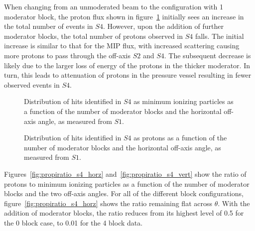 When changing from an unmoderated beam to the configuration with 1 moderator block, the proton flux shown in figure~\ref{fig:thetas4pro} initially sees an increase in the total number of events in $\mathit{S4}$.
However, upon the addition of further moderator blocks, the total number of protons observed in $\mathit{S4}$ falls.
The initial increase is similar to that for the MIP flux, with increased scattering causing more protons to pass through the off-axis $\mathit{S2}$ and $\mathit{S4}$.
The subsequent decrease is likely due to the larger loss of energy of the protons in the thicker moderator.
In turn, this leads to attenuation of protons in the pressure vessel resulting in fewer observed events in $\mathit{S4}$.

\begin{figure}[!ht]
  \begin{minipage}[t]{0.48\textwidth}
    \begin{adjustbox}{max totalsize={\textwidth}{.35\textheight},center}
      
    \end{adjustbox}
    \caption{Distribution of hits identified in $\mathit{S4}$ as minimum ionizing particles as a function of the number of moderator blocks and the horizontal off-axis angle, as measured from $\mathit{S1}$.}
    \label{fig:thetas4mip}
  \end{minipage}
  \hspace{0.3cm}
  \begin{minipage}[t]{0.48\textwidth}
    \begin{adjustbox}{max totalsize={\textwidth}{.35\textheight},center}
      
    \end{adjustbox}
    \caption{Distribution of hits identified in $\mathit{S4}$ as protons as a function of the number of moderator blocks and the horizontal off-axis angle, as measured from $\mathit{S1}$.}
    \label{fig:thetas4pro}
  \end{minipage} 
\end{figure}	

Figures~\ref{fig:propiratio_s4_horz} and~\ref{fig:propiratio_s4_vert} show the ratio of protons to minimum ionizing particles as a function of the number of moderator blocks and the two off-axis angles.
For all of the different block configurations, figure~\ref{fig:propiratio_s4_horz} shows the ratio remaining flat across $\theta$.
With the addition of moderator blocks, the ratio reduces from its highest level of 0.5 for the 0 block case, to 0.01 for the 4 block data.

